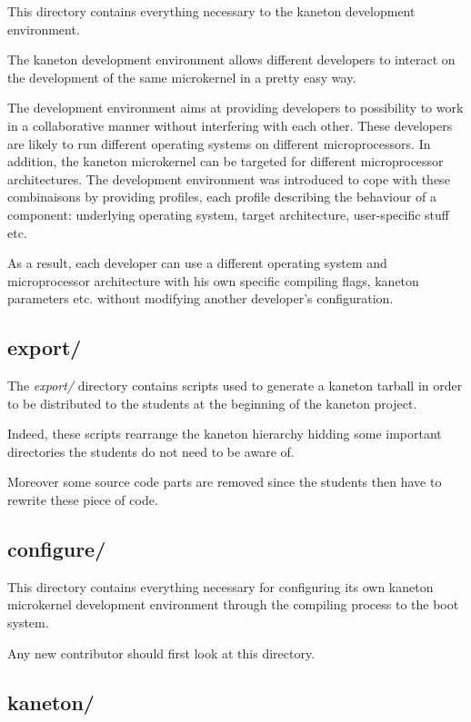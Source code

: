 This directory contains everything necessary to the kaneton development
environment.

The kaneton development environment allows different developers to
interact on the development of the same microkernel in a pretty easy way.

The development environment aims at providing developers to possibility to
work in a collaborative manner without interfering with each other. These
developers are likely to run different operating systems on different
microprocessors. In addition, the kaneton microkernel can be targeted for
different microprocessor architectures. The development environment was
introduced to cope with these combinaisons by providing profiles, each
profile describing the behaviour of a component: underlying operating system,
target architecture, user-specific stuff etc.

As a result, each developer can use a different operating system and
microprocessor architecture with his own specific compiling flags, kaneton
parameters etc. without modifying another developer's configuration.


\subsection*{export/}

The \textit{export/} directory contains scripts used to generate a kaneton
tarball in order to be distributed to the students at the beginning of the
kaneton project.

Indeed, these scripts rearrange the kaneton hierarchy hidding some
important directories the students do not need to be aware of.

Moreover some source code parts are removed since the students then have to
rewrite these piece of code.


\subsection*{configure/}

This directory contains everything necessary for configuring its own
kaneton microkernel development environment through the compiling process
to the boot system.

Any new contributor should first look at this directory.


\subsection*{kaneton/}

